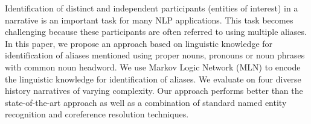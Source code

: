 Identification of distinct and independent participants (entities of interest) in a narrative is an important task for many NLP applications. This task becomes challenging because these participants are often referred to using multiple aliases.  In this paper, we propose an approach based on linguistic knowledge for identification of aliases mentioned using proper nouns, pronouns or noun phrases with common noun headword. We use Markov Logic Network (MLN) to encode the linguistic knowledge for identification of aliases. We evaluate on four diverse history narratives of varying complexity. Our approach performs better than the state-of-the-art approach as well as a combination of standard named entity recognition and coreference resolution techniques.
